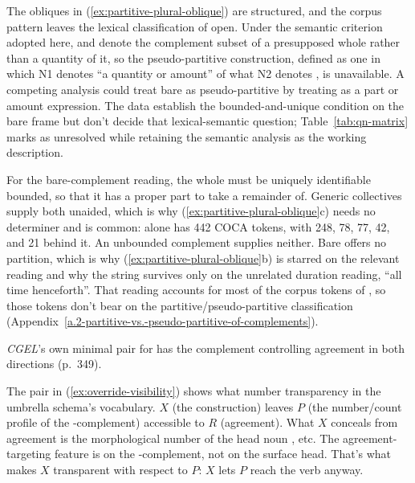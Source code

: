 The obliques in (\ref{ex:partitive-plural-oblique}) are structured, and the corpus pattern leaves the lexical classification of  open. Under the semantic criterion adopted here,  and  denote the complement subset of a presupposed whole rather than a quantity of it, so the pseudo-partitive construction, defined as one in which N1 denotes \enquote{a quantity or amount} of what N2 denotes \autocite[271]{van-eynde-kim-2023-pseudo-partitives}, is unavailable. A competing analysis could treat bare  as pseudo-partitive by treating  as a part or amount expression. The data establish the bounded-and-unique condition on the bare frame but don't decide that lexical-semantic question; Table~\ref{tab:qn-matrix} marks  as unresolved while retaining the semantic analysis as the working description.

For the bare-complement reading, the whole must be uniquely identifiable  bounded, so that it has a proper part to take a remainder of. Generic collectives supply both unaided, which is why (\ref{ex:partitive-plural-oblique}c) needs no determiner and is common:  alone has 442 COCA tokens, with  248,  78,  77,  42, and  21 behind it. An unbounded complement supplies neither. Bare  offers no partition, which is why (\ref{ex:partitive-plural-oblique}b) is starred on the relevant reading and why the string survives only on the unrelated duration reading, \enquote{all time henceforth}. That reading accounts for most of the corpus tokens of , so those tokens don't bear on the partitive/pseudo-partitive classification (Appendix~\ref{a.2-partitive-vs.-pseudo-partitive-of-complements}).

\textit{CGEL}'s own minimal pair for  has the complement controlling agreement in both directions (p.~349).

\ea\label{ex:override-visibility}
\ea {}
\ex {}
\z
\z

The pair in (\ref{ex:override-visibility}) shows what number transparency  in the umbrella schema's vocabulary. $X$ (the construction) leaves $P$ (the number/count profile of the -complement) accessible to $R$ (agreement). What $X$ conceals from agreement is the morphological number of the head noun , etc. The agreement-targeting feature is on the -complement, not on the surface head. That's what makes $X$ transparent with respect to $P$: $X$ lets $P$ reach the verb anyway.

